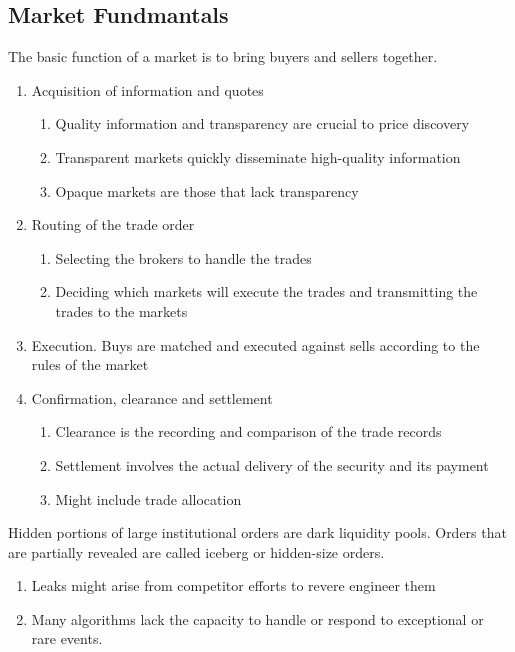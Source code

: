 \subsection{Market Fundmantals}

The basic function of a market is to bring buyers and sellers together.

\begin{process}
\begin{enumerate}[label=\roman*.]
\setlength{\itemsep}{0pt}
\item Acquisition of information and quotes
\begin{enumerate}[label=\arabic*.]
\setlength{\itemsep}{0pt}
\item Quality information and transparency are crucial to price discovery
\item Transparent markets quickly disseminate high-quality information
\item Opaque markets are those that lack transparency
\end{enumerate}
\item Routing of the trade order
\begin{enumerate}[label=\arabic*.]
\setlength{\itemsep}{0pt}
\item Selecting the brokers to handle the trades
\item Deciding which markets will execute the trades and transmitting the trades to the markets
\end{enumerate}
\item Execution. Buys are matched and executed against sells according to the rules of the market
\item Confirmation, clearance and settlement
\begin{enumerate}[label=\arabic*.]
\setlength{\itemsep}{0pt}
\item Clearance is the recording and comparison of the trade records
\item Settlement involves the actual delivery of the security and its payment
\item Might include trade allocation
\end{enumerate}
\end{enumerate}
\end{process}

Hidden portions of large institutional orders are dark liquidity pools. Orders that are partially revealed are called iceberg or hidden-size orders.

\begin{remark}
\begin{enumerate}[label=\roman*.]
\setlength{\itemsep}{0pt}
\item Leaks might arise from competitor efforts to revere engineer them
\item Many algorithms lack the capacity to handle or respond to exceptional or rare events.
\end{enumerate}
\end{remark}

